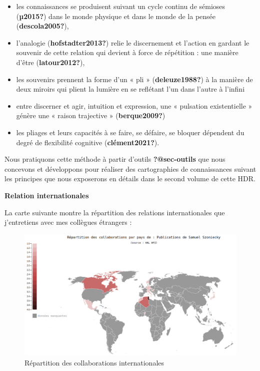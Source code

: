 \documentclass[
  a4paper,
  DIV=11,
  numbers=noendperiod]{scrreprt}
\begin{document}
\begin{itemize}
\item
  les connaissances se produisent suivant un cycle continu de sémioses
  (\textbf{µ2015?}) dans le monde physique et dans le monde de la pensée
  (\textbf{descola2005?}),
\item
  l'analogie (\textbf{hofstadter2013?}) relie le discernement et
  l'action en gardant le souvenir de cette relation qui devient à force
  de répétition : une manière d'être (\textbf{latour2012?}),
\item
  les souvenirs prennent la forme d'un « pli » (\textbf{deleuze1988?}) à
  la manière de deux miroirs qui plient la lumière en se reflétant l'un
  dans l'autre à l'infini
\item
  entre discerner et agir, intuition et expression, une « pulsation
  existentielle » génère une « raison trajective »
  (\textbf{berque2009?})
\item
  les pliages et leurs capacités à se faire, se défaire, se bloquer
  dépendent du degré de flexibilité cognitive (\textbf{clément2021?}).
\end{itemize}

Nous pratiquons cette méthode à partir d'outils \textbf{?@sec-outils}
que nous concevons et développons pour réaliser des cartographies de
connaissances suivant les principes que nous exposerons en détails dans
le second volume de cette HDR.

\textbf{Relation internationales}

La carte suivante montre la répartition des relations internationales
que j'entretiens avec mes collègues étrangers :

\begin{figure}[H]

{\centering \includegraphics{images/samszo.github.io_StatsHAL_.png}

}

\caption{Répartition des collaborations internationales}

\end{figure}%
\end{document}
